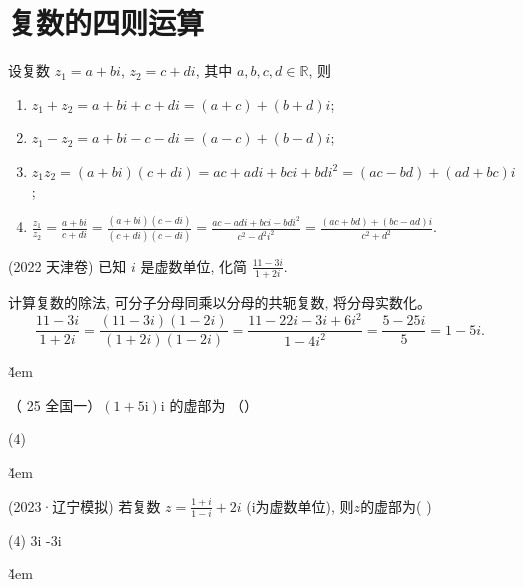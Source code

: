 
\section{复数的四则运算}

\begin{theorem}[复数的四则运算]
    设复数 $z_{1}=a+bi$, $z_{2}=c+di$, 其中 $a,b,c,d\in \mathbb{R}$, 则
    \begin{enumerate}
        \item $z_{1}+z_{2}=a+bi+c+di=(a+c)+(b+d)i$;
        \item $z_{1}-z_{2}=a+bi-c-di=(a-c)+(b-d)i$;
        \item $z_{1}z_{2}=(a+bi)(c+di)=ac+adi+bci+bdi^{2}=(ac-bd)+(ad+bc)i$;
        \item $\frac{z_{1}}{z_{2}}=\frac{a+bi}{c+di}=\frac{(a+bi)(c-di)}{(c+di)(c-di)}=\frac{ac-adi+bci-bdi^{2}}{c^{2}-d^{2}i^{2}}=\frac{(ac+bd)+(bc-ad)i}{c^{2}+d^{2}}.$
    \end{enumerate}
\end{theorem}

\begin{example}(2022 天津卷)
    已知 $i$ 是虚数单位, 化简 $\frac{11-3i}{1+2i}$.
    \begin{solution}
        计算复数的除法, 可分子分母同乘以分母的共轭复数, 将分母实数化。
        \[
            \frac{11-3i}{1+2i}=\frac{(11-3i)(1-2i)}{(1+2i)(1-2i)}=\frac{11-22i-3i+6i^{2}}{1-4i^{2}}=\frac{5-25i}{5}=1-5i.
        \]
    \end{solution}
\end{example}

\v{4em}

\begin{example}
    （ 25 全国一）$(1+5 \mathrm{i}) \mathrm{i}$ 的虚部为 （\qquad）
    \begin{tasks}(4)
    \end{tasks}
\end{example}

\v{4em}

\begin{example}(2023·辽宁模拟)
    若复数 $z=\frac{1+i}{1-i}+2i$ (i为虚数单位), 则$z$的虚部为( \quad )
    \begin{tasks}(4)
        \task 3i
        \task -3i
    \end{tasks}
\end{example}

\v{4em}

